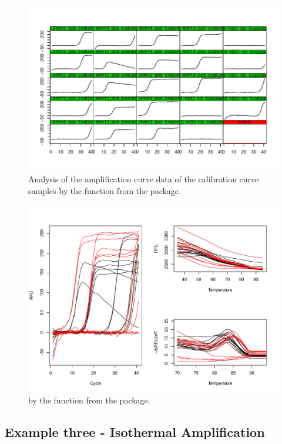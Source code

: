 \begin{figure}[htbp]
  \centering
  \includegraphics{figures/plotCurves.pdf}
  \caption{Analysis of the amplification curve data of the calibration curve 
samples by the  function from the  package.}
  \label{figure:plotCurves}
\end{figure}

\begin{figure}[htbp]
  \centering
  \includegraphics[clip=true, width=16cm]{figures/amp_melt.pdf}
  \caption{by the  function from the  package.}
  \label{figure:amp_melt}
\end{figure}

\subsection{Example three - Isothermal Amplification}

